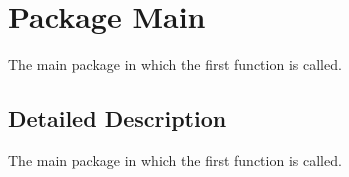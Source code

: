 \hypertarget{namespace_main}{\section{Package Main}
\label{namespace_main}
}


The main package in which the first function is called.  




\subsection{Detailed Description}
The main package in which the first function is called. 